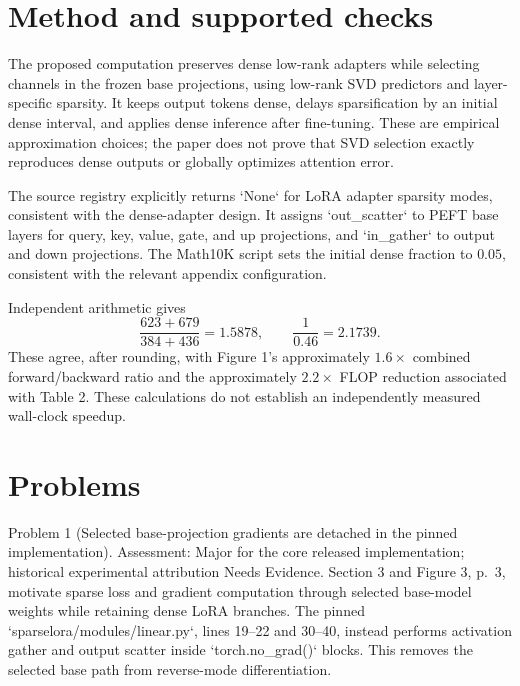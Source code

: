 \documentclass[10pt]{article}
\begin{document}
\section*{Method and supported checks}
The proposed computation preserves dense low-rank adapters while selecting channels in the frozen base projections, using low-rank SVD predictors and layer-specific sparsity. It keeps output tokens dense, delays sparsification by an initial dense interval, and applies dense inference after fine-tuning. These are empirical approximation choices; the paper does not prove that SVD selection exactly reproduces dense outputs or globally optimizes attention error.\par
The source registry explicitly returns `None` for LoRA adapter sparsity modes, consistent with the dense-adapter design. It assigns `out\_scatter` to PEFT base layers for query, key, value, gate, and up projections, and `in\_gather` to output and down projections. The Math10K script sets the initial dense fraction to \(0.05\), consistent with the relevant appendix configuration.\par
Independent arithmetic gives \[\frac{623+679}{384+436}=1.5878,\qquad \frac1{0.46}=2.1739.\] These agree, after rounding, with Figure 1’s approximately \(1.6\times\) combined forward/backward ratio and the approximately \(2.2\times\) FLOP reduction associated with Table 2. These calculations do not establish an independently measured wall-clock speedup.\par
\section*{Problems}
Problem 1 (Selected base-projection gradients are detached in the pinned implementation).  Assessment: Major for the core released implementation; historical experimental attribution Needs Evidence. Section 3 and Figure 3, p. 3, motivate sparse loss and gradient computation through selected base-model weights while retaining dense LoRA branches. The pinned `sparselora/modules/linear.py`, lines 19–22 and 30–40, instead performs activation gather and output scatter inside `torch.no\_grad()` blocks. This removes the selected base path from reverse-mode differentiation.\par
\end{document}

